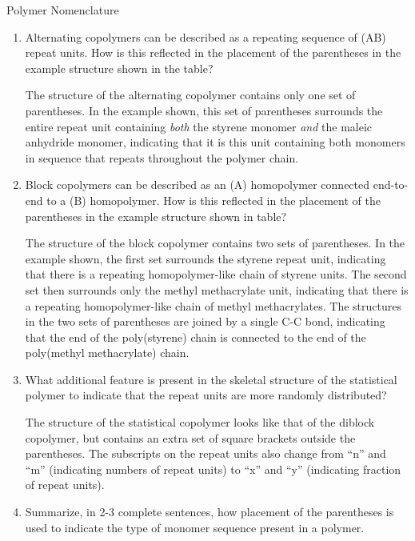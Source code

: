\begin{activity}{Polymer Nomenclature}
\begin{ctqs}
\begin{enumerate}
			\item Alternating copolymers can be described as a repeating sequence of (AB) repeat units.  How is this reflected in the placement of the parentheses in the example structure shown in the table?
			
				\begin{solution}[1in]{}
				The structure of the alternating copolymer contains only one set of parentheses.  In the example shown, this set of parentheses surrounds the entire repeat unit containing \emph{both} the styrene monomer \emph{and} the maleic anhydride monomer, indicating that it is this unit containing both monomers in sequence that repeats throughout the polymer chain.
				\end{solution}
			
			\item Block copolymers can be described as an (A) homopolymer connected end-to-end to a (B) homopolymer.  How is this reflected in the placement of the parentheses in the example structure shown in table?  
			
				\begin{solution}[1in]{}
				The structure of the block copolymer contains two sets of parentheses.  In the example shown, the first set surrounds the styrene repeat unit, indicating that there is a repeating homopolymer-like chain of styrene units.  The second set then surrounds only the methyl methacrylate unit, indicating that there is a repeating homopolymer-like chain of methyl methacrylates.  The structures in the two sets of parentheses are joined by a single C-C bond, indicating that the end of the poly(styrene) chain is connected to the end of the poly(methyl methacrylate) chain.
				\end{solution}

			\item What additional feature is present in the skeletal structure of the statistical polymer to indicate that the repeat units are more randomly distributed?
			
				\begin{solution}[1in]{}
				The structure of the statistical copolymer looks like that of the diblock copolymer, but contains an extra set of square brackets outside the parentheses.  The subscripts on the repeat units also change from ``n'' and ``m'' (indicating numbers of repeat units) to ``x'' and ``y'' (indicating fraction of repeat units).
				\end{solution}
			
			\item Summarize, in 2-3 complete sentences, how placement of the parentheses is used to indicate the type of monomer sequence present in a polymer.
			

\end{enumerate}
\end{ctqs}
\end{activity}
